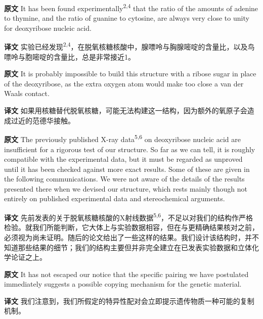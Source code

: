 \documentclass[UTF8,zihao=-4]{ctexart}
\newcommand{\BodyFont}{\fontsize{10.5pt}{15.5pt}\selectfont}
\renewenvironment{quote}{\par\noindent\begingroup\BodyFont}{\par\endgroup}
\begin{document}
\begin{quote}
\noindent\textbf{原文} It has been found experimentally\textsuperscript{2,4} that the ratio of the amounts of adenine to thymine, and the ratio of guanine to cytosine, are always very close to unity for deoxyribose nucleic acid.

\smallskip
\noindent\textbf{译文} 实验已经发现\textsuperscript{2,4}，在脱氧核糖核酸中，腺嘌呤与胸腺嘧啶的含量比，以及鸟嘌呤与胞嘧啶的含量比，总是非常接近1。
\end{quote}

\begin{quote}
\noindent\textbf{原文} It is probably impossible to build this structure with a ribose sugar in place of the deoxyribose, as the extra oxygen atom would make too close a van der Waals contact.

\smallskip
\noindent\textbf{译文} 如果用核糖替代脱氧核糖，可能无法构建这一结构，因为额外的氧原子会造成过近的范德华接触。
\end{quote}

\begin{quote}
\noindent\textbf{原文} The previously published X-ray data\textsuperscript{5,6} on deoxyribose nucleic acid are insufficient for a rigorous test of our structure. So far as we can tell, it is roughly compatible with the experimental data, but it must be regarded as unproved until it has been checked against more exact results. Some of these are given in the following communications. We were not aware of the details of the results presented there when we devised our structure, which rests mainly though not entirely on published experimental data and stereochemical arguments.

\smallskip
\noindent\textbf{译文} 先前发表的关于脱氧核糖核酸的X射线数据\textsuperscript{5,6}，不足以对我们的结构作严格检验。就我们所能判断，它大体上与实验数据相容，但在与更精确结果核对之前，必须视为尚未证明。随后的论文给出了一些这样的结果。我们设计该结构时，并不知道那些结果的细节；我们的结构主要但并非完全建立在已发表实验数据和立体化学论证之上。
\end{quote}

\begin{quote}
\noindent\textbf{原文} It has not escaped our notice that the specific pairing we have postulated immediately suggests a possible copying mechanism for the genetic material.

\smallskip
\noindent\textbf{译文} 我们注意到，我们所假定的特异性配对会立即提示遗传物质一种可能的复制机制。
\end{quote}
\end{document}
